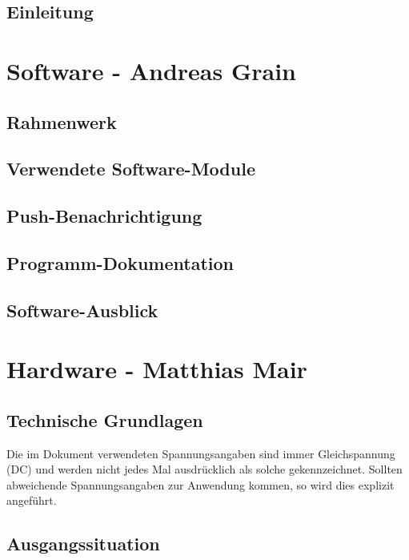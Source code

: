 \documentclass[a4paper, twoside, 12pt, openright]{memoir}
\newcommand{\AndreasGrain}{Andreas Grain}
\newcommand{\MatthiasMair}{Matthias Mair}
\newcommand{\authorName}{\AndreasGrain\ / \MatthiasMair}
\begin{document}
\mainmatter
\chapter{Einleitung}

\cleartoverso

\renewcommand{\authorName}{\AndreasGrain}
\part{Software - \AndreasGrain}
\chapter{Rahmenwerk}

\chapter{Verwendete Software-Module}

\chapter{Push-Benachrichtigung}
\label{ch:push}

\chapter{Programm-Dokumentation}

\chapter{Software-Ausblick}

\cleartoverso

\renewcommand{\authorName}{\MatthiasMair}
\part{Hardware - \MatthiasMair}
\chapter{Technische Grundlagen}
Die im Dokument verwendeten Spannungsangaben sind immer Gleichspannung (DC) und werden nicht jedes Mal ausdrücklich als solche gekennzeichnet. Sollten abweichende Spannungsangaben zur Anwendung kommen, so wird dies explizit angeführt.

\chapter{Ausgangssituation}

\end{document}
